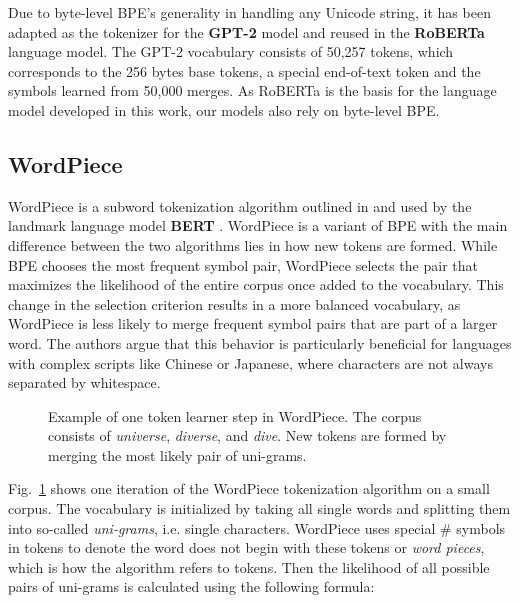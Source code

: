 Due to byte-level BPE's generality in handling any Unicode string, it has been
adapted as the tokenizer for the \textbf{GPT-2} \cite{radford2019gpt2} model and
reused in the \textbf{RoBERTa} \cite{liu2019roberta} language model. The GPT-2
vocabulary consists of 50,257 tokens, which corresponds to the 256 bytes base
tokens, a special end-of-text token and the symbols learned from 50,000 merges.
As RoBERTa is the basis for the language model developed in this work, our
models also rely on byte-level BPE.

\subsection{WordPiece} \label{subsec:wordpiece} 

WordPiece is a subword tokenization algorithm outlined in
\cite{schuster2012japanese} and used by the landmark language model
\textbf{BERT} \cite{devlin2019bert}. WordPiece is a variant of BPE with the main
difference between the two algorithms lies in how new tokens are formed. While
BPE chooses the most frequent symbol pair, WordPiece selects the pair that
maximizes the likelihood of the entire corpus once added to the vocabulary. This
change in the selection criterion results in a more balanced vocabulary, as
WordPiece is less likely to merge frequent symbol pairs that are part of a
larger word. The authors argue that this behavior is particularly beneficial for
languages with complex scripts like Chinese or Japanese, where characters are
not always separated by whitespace. 

\begin{figure}[htb]
    \centering
     
    \caption[Example of one token learner step in WordPiece]{Example of one
    token learner step in WordPiece. The corpus consists of \textit{universe},
    \textit{diverse}, and \textit{dive}. New tokens are formed by merging the
    most likely pair of uni-grams.}    
    \label{fig:wordpiece}
\end{figure}

Fig.~\ref{fig:wordpiece} shows one iteration of the WordPiece tokenization
algorithm on a small corpus. The vocabulary is initialized by taking all single
words and splitting them into so-called \textit{uni-grams}, i.e. single
characters. WordPiece uses special \# symbols in tokens to denote the word does
not begin with these tokens or \textit{word pieces}, which is how the algorithm
refers to tokens. Then the likelihood of all possible pairs of uni-grams is
calculated using the following formula:

